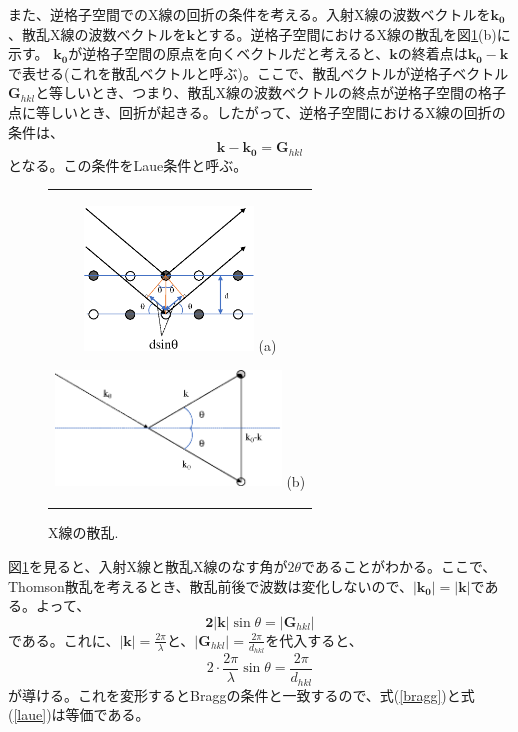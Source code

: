 \documentclass[11pt,a4j,uplatex]{jsarticle}
\begin{document}
また、逆格子空間でのX線の回折の条件を考える。入射X線の波数ベクトルを$\bm{k_0}$、散乱X線の波数ベクトルを$\bm{k}$とする。逆格子空間におけるX線の散乱を図\ref{hasuu}(b)に示す。
$\bm{k_0}$が逆格子空間の原点を向くベクトルだと考えると、$\bm{k}$の終着点は$\bm{k_0-k}$で表せる(これを散乱ベクトルと呼ぶ)。ここで、散乱ベクトルが逆格子ベクトル$\bm{G}_{hkl}$と等しいとき、つまり、散乱X線の波数ベクトルの終点が逆格子空間の格子点に等しいとき、回折が起きる。したがって、逆格子空間におけるX線の回折の条件は、
\begin{equation}
 \bm{k-k_0}=\bm{G}_{hkl}
 \label{laue}
\end{equation}
となる。この条件をLaue条件と呼ぶ。
\begin{figure}[ht]
 \centering
 \begin{tabular}{c}

  \begin{minipage}{0.5\hsize}
   \centering
   \includegraphics[clip, width=4.5cm]{dsinq.eps}
   \hspace{2cm} (a)
  \end{minipage}

  \begin{minipage}{0.5\hsize}
   \centering
   \includegraphics[clip, width=6cm]{hasuu.eps}
   \hspace{2cm} (b)
  \end{minipage}

 \end{tabular}
 \caption{X線の散乱.}
 \label{hasuu}

\end{figure}


\newpage%
図\ref{hasuu}を見ると、入射X線と散乱X線のなす角が$2\theta$であることがわかる。ここで、Thomson散乱を考えるとき、散乱前後で波数は変化しないので、$\bm{|k_0|=|k|}$である。よって、
\begin{equation}
 \bm{2|k|}\sin\theta=|\bm{G}_{hkl}|
 \nonumber
\end{equation}
である。これに、$\bm{|k|}=\frac{2\pi}{\lambda}$と、$|\bm{G}_{hkl}|=\frac{2\pi}{d_{hkl}}$を代入すると、
\begin{equation}
 2\cdot\frac{2\pi}{\lambda}\sin\theta=\frac{2\pi}{d_{hkl}}
 \nonumber
\end{equation}
が導ける。これを変形するとBraggの条件と一致するので、式(\ref{bragg})と式(\ref{laue})は等価である。
\fi
\end{document}
